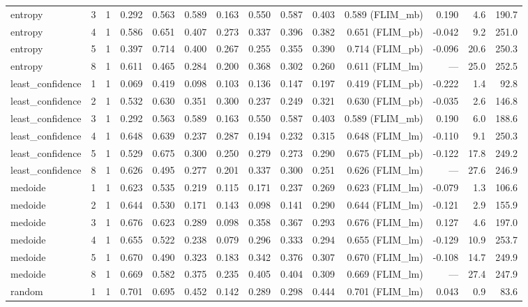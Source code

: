 \begin{tabular}{llrrrrrrrrrrrr}
entropy & 3 & 1 & 0.292 & 0.563 & 0.589 & 0.163 & 0.550 & 0.587 & 0.403 & 0.589 (FLIM\_mb) & 0.190 & 4.6 & 190.7 \\
entropy & 4 & 1 & 0.586 & 0.651 & 0.407 & 0.273 & 0.337 & 0.396 & 0.382 & 0.651 (FLIM\_pb) & -0.042 & 9.2 & 251.0 \\
entropy & 5 & 1 & 0.397 & 0.714 & 0.400 & 0.267 & 0.255 & 0.355 & 0.390 & 0.714 (FLIM\_pb) & -0.096 & 20.6 & 250.3 \\
entropy & 8 & 1 & 0.611 & 0.465 & 0.284 & 0.200 & 0.368 & 0.302 & 0.260 & 0.611 (FLIM\_lm) & --- & 25.0 & 252.5 \\
least\_confidence & 1 & 1 & 0.069 & 0.419 & 0.098 & 0.103 & 0.136 & 0.147 & 0.197 & 0.419 (FLIM\_pb) & -0.222 & 1.4 & 92.8 \\
least\_confidence & 2 & 1 & 0.532 & 0.630 & 0.351 & 0.300 & 0.237 & 0.249 & 0.321 & 0.630 (FLIM\_pb) & -0.035 & 2.6 & 146.8 \\
least\_confidence & 3 & 1 & 0.292 & 0.563 & 0.589 & 0.163 & 0.550 & 0.587 & 0.403 & 0.589 (FLIM\_mb) & 0.190 & 6.0 & 188.6 \\
least\_confidence & 4 & 1 & 0.648 & 0.639 & 0.237 & 0.287 & 0.194 & 0.232 & 0.315 & 0.648 (FLIM\_lm) & -0.110 & 9.1 & 250.3 \\
least\_confidence & 5 & 1 & 0.529 & 0.675 & 0.300 & 0.250 & 0.279 & 0.273 & 0.290 & 0.675 (FLIM\_pb) & -0.122 & 17.8 & 249.2 \\
least\_confidence & 8 & 1 & 0.626 & 0.495 & 0.277 & 0.201 & 0.337 & 0.300 & 0.251 & 0.626 (FLIM\_lm) & --- & 27.6 & 246.9 \\
medoide & 1 & 1 & 0.623 & 0.535 & 0.219 & 0.115 & 0.171 & 0.237 & 0.269 & 0.623 (FLIM\_lm) & -0.079 & 1.3 & 106.6 \\
medoide & 2 & 1 & 0.644 & 0.530 & 0.171 & 0.143 & 0.098 & 0.141 & 0.290 & 0.644 (FLIM\_lm) & -0.121 & 2.9 & 155.9 \\
medoide & 3 & 1 & 0.676 & 0.623 & 0.289 & 0.098 & 0.358 & 0.367 & 0.293 & 0.676 (FLIM\_lm) & 0.127 & 4.6 & 197.0 \\
medoide & 4 & 1 & 0.655 & 0.522 & 0.238 & 0.079 & 0.296 & 0.333 & 0.294 & 0.655 (FLIM\_lm) & -0.129 & 10.9 & 253.7 \\
medoide & 5 & 1 & 0.670 & 0.490 & 0.323 & 0.183 & 0.342 & 0.376 & 0.307 & 0.670 (FLIM\_lm) & -0.108 & 14.7 & 249.9 \\
medoide & 8 & 1 & 0.669 & 0.582 & 0.375 & 0.235 & 0.405 & 0.404 & 0.309 & 0.669 (FLIM\_lm) & --- & 27.4 & 247.9 \\
random & 1 & 1 & 0.701 & 0.695 & 0.452 & 0.142 & 0.289 & 0.298 & 0.444 & 0.701 (FLIM\_lm) & 0.043 & 0.9 & 83.6 \\

\end{tabular}
